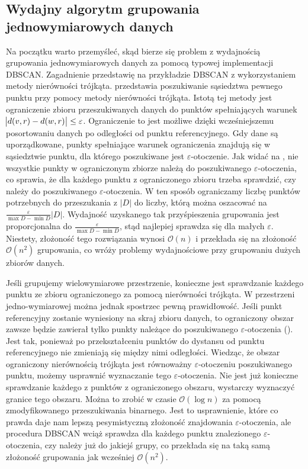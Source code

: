 \subsection{Wydajny algorytm grupowania jednowymiarowych danych}
Na początku warto przemyśleć, skąd bierze się problem z wydajnością grupowania jednowymiarowych danych za pomocą typowej implementacji DBSCAN. Zagadnienie przedstawię na przykładzie DBSCAN z wykorzystaniem metody nierówności trójkąta.  przedstawia poszukiwanie sąsiedztwa pewnego punktu przy pomocy metody nierówności trójkąta. Istotą tej metody jest ograniczenie zbioru przeszukiwanych danych do punktów spełniających warunek $ \abs{d(v, r) - d(w, r)} \le \varepsilon $. Ograniczenie to jest możliwe dzięki wcześniejszemu posortowaniu danych po odległości od punktu referencyjnego. Gdy dane są uporządkowane, punkty spełniające warunek ograniczenia znajdują się w sąsiedztwie punktu, dla którego poszukiwane jest $ \varepsilon $-otoczenie. Jak widać na , nie wszystkie punkty w ograniczonym zbiorze należą do poszukiwanego $ \varepsilon $-otoczenia, co sprawia, że dla każdego punktu z ograniczonego zbioru trzeba sprawdzić, czy należy do poszukiwanego $ \varepsilon $-otoczenia. W ten sposób ograniczamy liczbę punktów potrzebnych do przeszukania z $ |D| $ do liczby, którą można oszacować na $ \frac{\varepsilon}{\max{D}-\min{D}}|D| $. Wydajność uzyskanego tak przyśpieszenia grupowania jest proporcjonalna do $ \frac{\varepsilon}{\max{D}-\min{D}} $, stąd najlepiej sprawdza się dla małych $ \varepsilon $. Niestety, złożoność tego rozwiązania wynosi $ \mathcal{O}(n) $ i przekłada się na złożoność $ \mathcal{O}(n^2) $ grupowania, co wróży problemy wydajnościowe przy grupowaniu dużych zbiorów danych.\par



Jeśli grupujemy wielowymiarowe przestrzenie, konieczne jest sprawdzanie każdego punktu ze zbioru ograniczonego za pomocą nierówności trójkąta. W przestrzeni jedno-wymiarowej można jednak spostrzec pewną prawidłowość. Jeśli punkt referencyjny zostanie wyniesiony na skraj zbioru danych, to ograniczony obszar zawsze będzie zawierał tylko punkty należące do poszukiwanego $ \varepsilon $-otoczenia (). Jest tak, ponieważ po przekształceniu punktów do dystansu od punktu referencyjnego nie zmieniają się między nimi odległości. Wiedząc, że obszar ograniczony nierównością trójkąta jest równoważny $ \varepsilon $-otoczeniu poszukiwanego punktu, możemy usprawnić wyznaczanie tego $ \varepsilon $-otoczenia. Nie jest już konieczne sprawdzanie każdego z punktów z ograniczonego obszaru, wystarczy wyznaczyć granice tego obszaru. Można to zrobić w czasie $ \mathcal{O}(\log{}n) $ za pomocą zmodyfikowanego przeszukiwania binarnego\cite{binaryboundarysearch}. Jest to usprawnienie, które co prawda daje nam lepszą pesymistyczną złożoność znajdowania $ \varepsilon $-otoczenia, ale procedura DBSCAN wciąż sprawdza dla każdego punktu znalezionego $ \varepsilon $-otoczenia, czy należy już do jakiejś grupy, co przekłada się na taką samą złożoność grupowania jak wcześniej $ \mathcal{O}(n^2) $.\par

